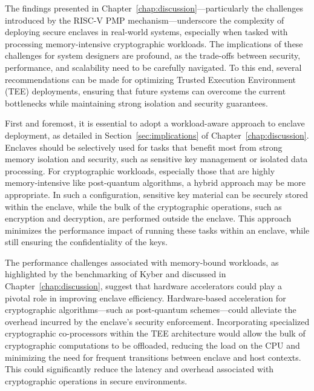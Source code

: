 The findings presented in Chapter~\ref{chap:discussion}—particularly the challenges introduced by the RISC-V PMP mechanism—underscore the complexity of deploying secure enclaves in real-world systems, especially when tasked with processing memory-intensive cryptographic workloads. The implications of these challenges for system designers are profound, as the trade-offs between security, performance, and scalability need to be carefully navigated. To this end, several recommendations can be made for optimizing Trusted Execution Environment (TEE) deployments, ensuring that future systems can overcome the current bottlenecks while maintaining strong isolation and security guarantees.

First and foremost, it is essential to adopt a workload-aware approach to enclave deployment, as detailed in Section~\ref{sec:implications} of Chapter~\ref{chap:discussion}. Enclaves should be selectively used for tasks that benefit most from strong memory isolation and security, such as sensitive key management or isolated data processing. For cryptographic workloads, especially those that are highly memory-intensive like post-quantum algorithms, a hybrid approach may be more appropriate. In such a configuration, sensitive key material can be securely stored within the enclave, while the bulk of the cryptographic operations, such as encryption and decryption, are performed outside the enclave. This approach minimizes the performance impact of running these tasks within an enclave, while still ensuring the confidentiality of the keys.

The performance challenges associated with memory-bound workloads, as highlighted by the benchmarking of Kyber and discussed in Chapter~\ref{chap:discussion}, suggest that hardware accelerators could play a pivotal role in improving enclave efficiency. Hardware-based acceleration for cryptographic algorithms—such as post-quantum schemes—could alleviate the overhead incurred by the enclave’s security enforcement. Incorporating specialized cryptographic co-processors within the TEE architecture would allow the bulk of cryptographic computations to be offloaded, reducing the load on the CPU and minimizing the need for frequent transitions between enclave and host contexts. This could significantly reduce the latency and overhead associated with cryptographic operations in secure environments.

